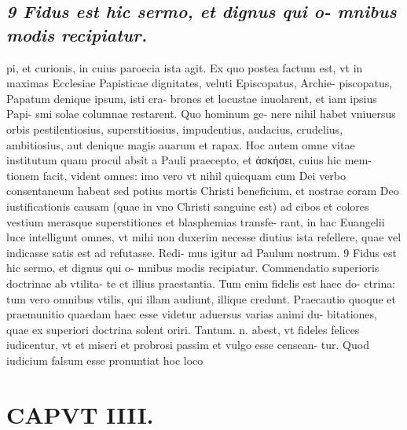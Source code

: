 \documentclass{article}
\begin{document}
\begin{pages}
\subsection*{\textit{9 Fidus est hic sermo, et dignus qui o- mnibus modis recipiatur.}}pi, et curionis, in cuius paroecia ista agit. Ex quo postea factum est, vt in maximas Ecclesiae Papisticae dignitates, veluti Episcopatus, Archie- piscopatus, Papatum denique ipsum, isti cra- brones et locustae inuolarent, et iam ipsius Papi- smi solae columnae restarent. Quo hominum ge- nere nihil habet vniuersus orbis pestilentiosius, superstitiosius, impudentius, audacius, crudelius, ambitiosius, aut denique magis auarum et rapax. Hoc autem omne vitae institutum quam procul absit a Pauli praecepto, et ἀσκήσει, cuius hic mem- tionem facit, vident omnes: imo vero vt nihil quicquam cum Dei verbo consentaneum habeat sed potius mortis Christi beneficium, et nostrae coram Deo iustificationis causam (quae in vno Christi sanguine est) ad cibos et colores vestium merasque superstitiones et blasphemias transfe- rant, in hac Euangelii luce intelligunt omnes, vt mihi non duxerim necesse diutius ista refellere, quae vel indicasse satis est ad refutasse. Redi- mus igitur ad Paulum nostrum. 9 Fidus est hic sermo, et dignus qui o- mnibus modis recipiatur. Commendatio superioris doctrinae ab vtilita- te et illius praestantia. Tum enim fidelis est haec do- ctrina: tum vero omnibus vtilis, qui illam audiunt, illique credunt. Praecautio quoque et praemunitio quaedam haec esse videtur aduersus varias animi du- bitationes, quae ex superiori doctrina solent oriri. Tantum. n. abest, vt fideles felices iudicentur, vt et miseri et probrosi passim et vulgo esse censean- tur. Quod iudicium falsum esse pronuntiat hoc loco  \pend
\section*{CAPVT  IIII. }
\marginpar{[ p.228 ]}\pstart {}
{}

\end{pages}
\end{document}
